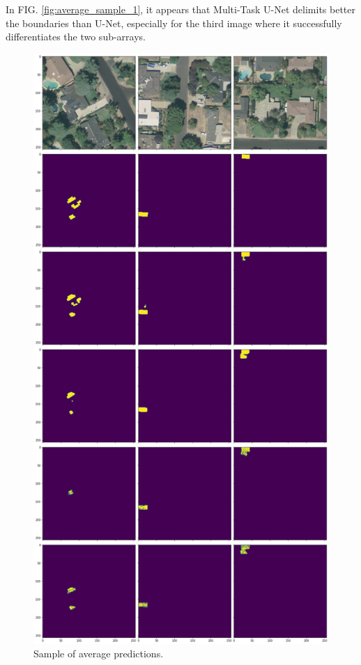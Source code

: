 \documentclass[twocolumn,superscriptaddress,aps,nofootinbib]{revtex4-1}
\begin{document}
In FIG. \ref{fig:average_sample_1}, it appears that Multi-Task U-Net delimits better the boundaries than U-Net, especially for the third image where it successfully differentiates the two sub-arrays.

\begin{figure}[h]
    \centering
    \includegraphics[width=\columnwidth]{resources/png/better.png}
    \caption{Sample of average predictions.}
    \label{fig:average_sample_2}
\end{figure}
\end{document}
